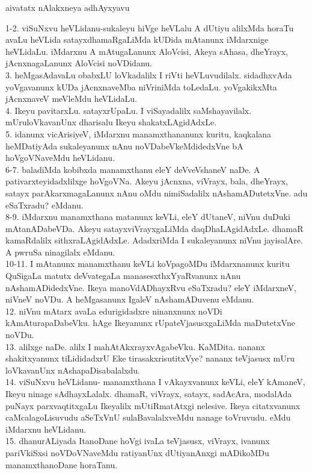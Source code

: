 \documentclass{article}
\begin{document}
\begin{center}
aivatatx nAlakxneya adhAyxyavu
\end{center}

1-2. viSuNxvu heVLidanu-sukaleyu hiVge heVLalu A dUtiyu alilxMda horaTu avaLu heVLida satayxdhamaRgaLiMda kUDida mAtanunx iMdarxnige heVLidaLu. iMdarxnu A mAtugaLanunx AloVcisi, Akeya sAhasa, dheYrayx, jAcnxnagaLanunx AloVcisi noVDidanu.\\
3. heMgasAdavaLu obabxLU loVkadalilx I riVti heVLuvudilalx. sidadhxvAda yoVgavanunx kUDa jAcnxnaveMba niVriniMda toLedaLu. yoVgakikxMta jAcnxnaveV meVleMdu heVLidaLu.\\
4. Ikeyu pavitarxLu. satayxrUpaLu. I viSayadalilx saMshayavilalx. mUruloVkavanUnx dharisalu Ikeyu shakatxLAgidAdxLe.\\
5. idanunx vicArisiyeV, iMdarxnu manamxthananunx kuritu, kaqkalana heMDatiyAda sukaleyanunx nAnu noVDabeVkeMdidedxVne bA hoVgoVNaveMdu heVLidanu.\\
6-7. baladiMda kobibxda manamxthanu eleY deVveVshaneV naDe. A pativarxteyidadxlilxge hoVgoVNa. Akeyu jAcnxna, viVrayx, bala, dheYrayx, satayx parAkarxmagaLanunx nAnu oMdu nimiSadalilx nAshamADutetxVne. adu eSaTxradu? eMdanu.\\
8-9. iMdarxnu manamxthana matanunx keVLi, eleY dUtaneV, niVnu duDuki mAtanADabeVDa. Akeyu satayxviVrayxgaLiMda daqDhaLAgidAdxLe. dhamaR kamaRdalilx sithxraLAgidAdxLe. AdadxriMda I sukaleyanunx niVnu jayisalAre. A pwruSa ninagilalx eMdanu.\\
10-11. I mAtanunx manamxthanu keVLi koVpagoMDu iMdarxnanunx kuritu QuSigaLa matutx deVvategaLa manasesxthxYyaRvanunx nAnu nAshamADidedxVne. Ikeya manoVdADhayxRvu eSaTxradu? eleY iMdarxneV, niVneV noVDu. A heMgasanunx IgaleV nAshamADuvenu eMdanu.\\
12. niVnu mAtarx avaLa edurigidadxre ninanxnunx noVDi kAmAturapaDabeVku. hAge Ikeyanunx rUpateVjasusxgaLiMda maDutetxVne noVDu.\\
13. alilxge naDe. alilx I mahAtAkxrayxvAgabeVku. KaMDita. nananx shakitxyanunx tiLididadxrU Eke tirasakxrisutitxVye? nananx teVjasusx mUru loVkavanUnx nAshapaDisabalalxdu.\\
14. viSuNxvu heVLidanu- manamxthana I vAkayxvanunx keVLi, eleY kAmaneV, Ikeyu ninage sAdhayxLalalx. dhamaR, viVrayx, satayx, sadAcAra, modalAda puNayx parxvaqtitxgaLu Ikeyalilx mUtiRmatAtxgi nelesive. Ikeya citatxvanunx caMcalagoLisuvudu aSeTxVnU sulaBavalalxveMdu nanage toVruvudu. eMdu iMdarxnu heVLidanu.\\
15. dhanurALiyada ItanoDane hoVgi ivaLa teVjasusx, viVrayx, ivanunx pariVkiSxsi noVDoVNaveMdu ratiyanUnx dUtiyanAnxgi mADikoMDu manamxthanoDane horaTanu.\\
\end{document}
